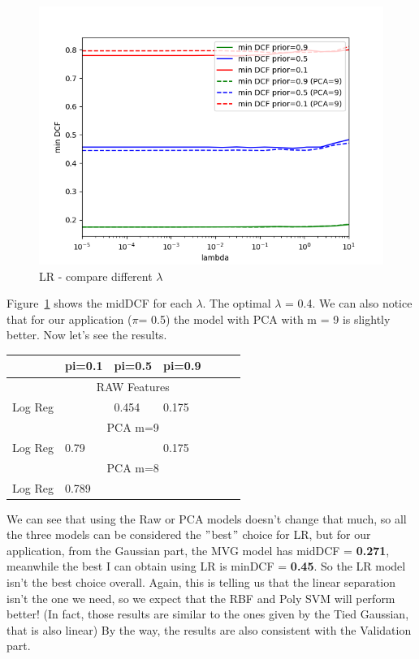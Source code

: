 \documentclass[english]{report}
\begin{document}
\begin{figure}[h!]
    \includegraphics[scale=0.5]{../../images/evaluation/LR_PCA_minDCF_comparison}
    \centering
    \caption{LR - compare different $\lambda$}
    \label{fig:LR_eval}
\end{figure}
Figure~\ref{fig:LR_eval} shows the midDCF for each $\lambda$.
The optimal $\lambda$ = 0.4. We can also notice that for our application ($\pi$= 0.5) the model with PCA with m = 9 is slightly better.
Now let's see the results.

\begin{table}[H]
    \centering
    \begin{tabular}{lllllll}
        \toprule
               & pi=0.1 & pi=0.5 & pi=0.9 \\ \midrule
                                & \multicolumn{3}{c}{RAW Features}  \\
    Log Reg    & \color{red}{0.789}      & 0.454      & 0.175  \\ \midrule
                                & \multicolumn{3}{c}{PCA m=9}  \\
    Log Reg    & 0.79     & \color{red}{ 0.45}       & 0.175 \\ \midrule
                                & \multicolumn{3}{c}{PCA m=8}  \\
    Log Reg    & 0.789      & \color{red}{ 0.45}      & \color{red}{0.174} \\
    \bottomrule
    \end{tabular}
    \label{tab:LinearLogReg_valid_eval}
\end{table}
We can see that using the Raw or PCA models doesn't change that much, so all the three models can be considered the \("\)best\("\) choice
for LR, but for our application, from the Gaussian part, the MVG model has midDCF = \textbf{0.271}, meanwhile the best I can obtain using LR is minDCF = \textbf{0.45}.
So the LR model isn't the best choice overall.
Again, this is telling us that the linear separation isn't the one we need,
so we expect that the RBF and Poly SVM will perform better!
(In fact, those results are similar to the ones given by the Tied Gaussian, that is also linear)
By the way, the results are also consistent with the Validation part.
\end{document}
